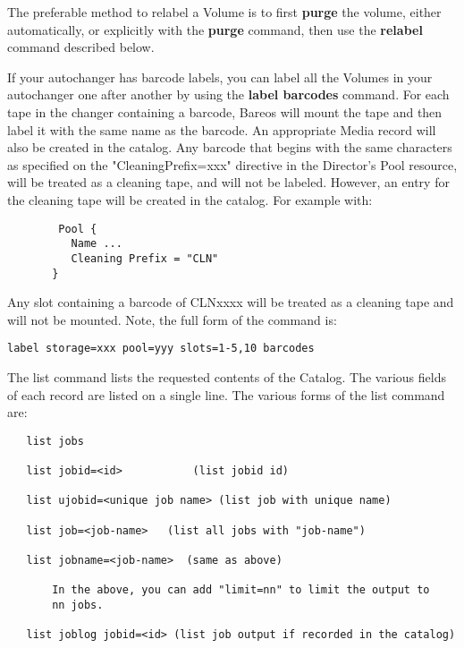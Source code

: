 \begin{description}
{The preferable method to relabel a Volume is to first {\bf purge}  the volume,
either automatically, or explicitly with the  {\bf purge} command, then use
the {\bf relabel} command described  below.

If your autochanger has barcode labels, you can label all the Volumes in
your autochanger one after another by using the {\bf label barcodes}
command.  For each tape in the changer containing a barcode, Bareos will
mount the tape and then label it with the same name as the barcode.  An
appropriate Media record will also be created in the catalog.  Any barcode
that begins with the same characters as specified on the
"CleaningPrefix=xxx" directive in the Director's Pool resource, will be
treated as a cleaning tape, and will not be labeled.  However, an entry for
the cleaning tape will be created in the catalog.  For example with:

\footnotesize
\begin{verbatim}
        Pool {
          Name ...
          Cleaning Prefix = "CLN"
       }

\end{verbatim}
\normalsize

Any slot containing a barcode of CLNxxxx will be treated as a cleaning tape
and will not be mounted.  Note, the full form of the command is:

\footnotesize
\begin{verbatim}
label storage=xxx pool=yyy slots=1-5,10 barcodes
\end{verbatim}
\normalsize

\item [list]
   The list command lists the requested contents of the Catalog.  The
   various fields of each record are listed on a single line.  The various
   forms of the list command are:

\footnotesize
\begin{verbatim}
   list jobs

   list jobid=<id>           (list jobid id)

   list ujobid=<unique job name> (list job with unique name)

   list job=<job-name>   (list all jobs with "job-name")

   list jobname=<job-name>  (same as above)

       In the above, you can add "limit=nn" to limit the output to
       nn jobs.

   list joblog jobid=<id> (list job output if recorded in the catalog)


\end{verbatim}}
\end{description}
